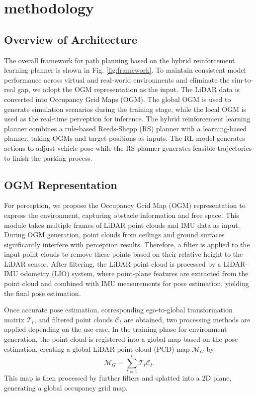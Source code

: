 \documentclass[ conference]{./support/ieeeconf}
\begin{document}
\section{methodology}
\subsection{Overview of Architecture}
The overall framework for path planning based on the hybrid reinforcement learning planner is shown in Fig. \ref{fig:framework}. 
To maintain consistent model performance across virtual and real-world environments and eliminate the sim-to-real gap, we adopt the OGM representation as the input. 
The LiDAR data is converted into Occupancy Grid Maps (OGM).
The global OGM is used to generate simulation scenarios during the training stage, while the local OGM is used as the real-time perception for inference.
The hybrid reinforcement learning planner combines a rule-based Reeds-Shepp (RS) planner with a learning-based planner, taking OGMs and target positions as inputs.
The RL model generates actions to adjust vehicle pose while the RS planner generates feasible trajectories to finish the parking process.

\subsection{OGM Representation}
For perception, we propose the Occupancy Grid Map (OGM) representation to express the environment, capturing obstacle information and free space. 
This module takes multiple frames of LiDAR point clouds and IMU data as input. 
During OGM generation, point clouds from ceilings and ground surfaces significantly interfere with perception results. 
Therefore, a filter is applied to the input point clouds to remove these points based on their relative height to the LiDAR sensor. 
After filtering, the LiDAR point cloud is processed by a LiDAR-IMU odometry (LIO) system\cite{bai2022faster}, where point-plane features are extracted from the point cloud and combined with IMU measurements for pose estimation, yielding the final pose estimation.

Once accurate pose estimation, corresponding ego-to-global transformation matrix $\mathcal{T}_t$, and filtered point clouds $\mathcal{C}_t$ are obtained, two processing methods are applied depending on the use case.
In the training phase for environment generation, the point cloud is registered into a global map based on the pose estimation, creating a global LiDAR point cloud (PCD) map $\mathcal{M}_G$ by
\begin{equation}
    \mathcal{M}_G=\sum_{t=1}^{t} \mathcal{T}_t \mathcal{C}_t.
\end{equation}
This map is then processed by further filters and splatted into a 2D plane, generating a global occupancy grid map.
\end{document}

